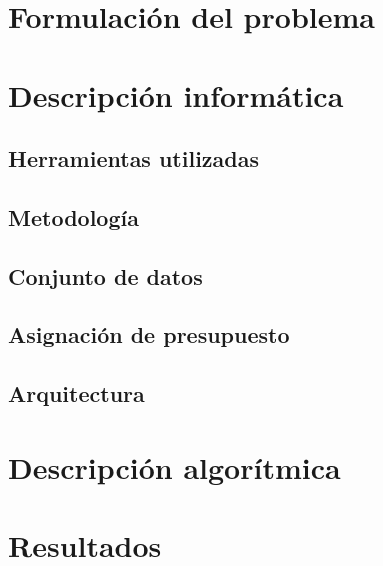 \documentclass[12pt,twoside,titlepage]{report}
\newcommand\blankpage{%
    \newpage
    \null
    \thispagestyle{empty}%
    \newpage}
\begin{document}
\blankpage

\chapter{Formulación del problema} \label{chap:formulacion_problema}


\chapter{Descripción informática} \label{chap:descinf}

\section{Herramientas utilizadas} \label{sec:herramientas}


\section{Metodología} \label{sec:metodologia}

\section{Conjunto de datos} \label{sec:datos}


\section{Asignación de presupuesto} \label{sec:asignacion_presupuestos}


\section{Arquitectura} \label{sec:desc_programas}







\chapter{Descripción algorítmica} \label{chap:descalg}


\chapter{Resultados} \label{chap:resultObtenidos}



\blankpage
\end{document}
